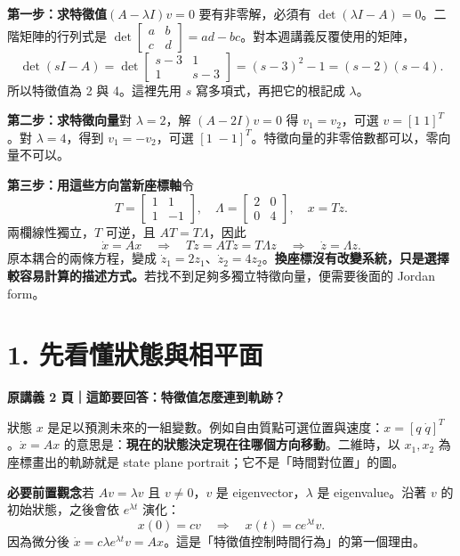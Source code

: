 \documentclass[12pt,a4paper]{article}
\newcommand{\topic}[3]{\clearpage\section*{#1}\textcolor{accent}{\textbf{原講義 #2 頁｜這節要回答：#3}}\par}
\begin{document}
\textbf{第一步：求特徵值}\quad $(A-\lambda I)v=0$ 要有非零解，必須有 $\det(\lambda I-A)=0$。二階矩陣的行列式是 $\det\begin{bmatrix}a&b\\c&d\end{bmatrix}=ad-bc$。對本週講義反覆使用的矩陣，
\[
 \det(sI-A)=\det\begin{bmatrix}s-3&1\\1&s-3\end{bmatrix}
 =(s-3)^2-1=(s-2)(s-4).
\]
所以特徵值為 2 與 4。這裡先用 $s$ 寫多項式，再把它的根記成 $\lambda$。

\textbf{第二步：求特徵向量}\quad 對 $\lambda=2$，解 $(A-2I)v=0$ 得 $v_1=v_2$，可選 $v=[1\;1]^T$。對 $\lambda=4$，得到 $v_1=-v_2$，可選 $[1\;-1]^T$。特徵向量的非零倍數都可以，零向量不可以。

\textbf{第三步：用這些方向當新座標軸}\quad 令
\[
 T=\begin{bmatrix}1&1\\1&-1\end{bmatrix},\quad
 \Lambda=\begin{bmatrix}2&0\\0&4\end{bmatrix},\quad x=Tz.
\]
兩欄線性獨立，$T$ 可逆，且 $AT=T\Lambda$，因此
\[
 \dot x=Ax\quad\Longrightarrow\quad
 T\dot z=ATz=T\Lambda z\quad\Longrightarrow\quad\dot z=\Lambda z.
\]
原本耦合的兩條方程，變成 $\dot z_1=2z_1$、$\dot z_2=4z_2$。\textbf{換座標沒有改變系統，只是選擇較容易計算的描述方式。}若找不到足夠多獨立特徵向量，便需要後面的 Jordan form。

\topic{1. 先看懂狀態與相平面}{2}{特徵值怎麼連到軌跡？}
狀態 $x$ 是足以預測未來的一組變數。例如自由質點可選位置與速度：$x=[q\;\dot q]^T$。$\dot x=Ax$ 的意思是：\textbf{現在的狀態決定現在往哪個方向移動}。二維時，以 $x_1,x_2$ 為座標畫出的軌跡就是 state plane portrait；它不是「時間對位置」的圖。

\textbf{必要前置觀念}\quad 若 $Av=\lambda v$ 且 $v\ne0$，$v$ 是 eigenvector，$\lambda$ 是 eigenvalue。沿著 $v$ 的初始狀態，之後會依 $e^{\lambda t}$ 演化：
\[
 x(0)=cv\quad\Longrightarrow\quad x(t)=ce^{\lambda t}v.
\]
因為微分後 $\dot x=c\lambda e^{\lambda t}v=Ax$。這是「特徵值控制時間行為」的第一個理由。
\end{document}
